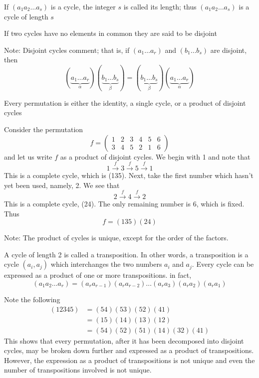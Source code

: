 \documentclass[12pt]{article}
\begin{document}
\begin{definition} If $(a_1a_2\dots a_s)$ is a cycle, the integer $s$ is called its length; thus $(a_1a_2\dots a_s)$ is a cycle of length $s$ \end{definition} 

\begin{definition} If two cycles have no elements in common they are said to be disjoint \end{definition} 

Note: Disjoint cycles comment; that is, if $(a_1\dots a_r)$ and $(b_1\dots b_s)$ are disjoint, then $$(\underbrace{a_1\dots a_r}_{\alpha})(\underbrace{b_1\dots b_s}_{\beta}) = (\underbrace{b_1\dots b_s}_{\beta})(\underbrace{a_1\dots a_r}_{\alpha}) $$ 

\begin{theorem} Every permutation is either the identity, a single cycle, or a product of disjoint cycles \end{theorem} 

\begin{example} Consider the permutation $$f = \begin{pmatrix} 1 & 2 & 3 & 4 & 5 & 6 \\ 3 & 4 & 5 & 2 & 1 & 6 \end{pmatrix} $$ and let us write $f$ as a product of disjoint cycles. We begin with 1 and note that $$ 1 \overset{f}{\rightarrow} 3 \overset{f}{\rightarrow} 5 \overset{f}{\rightarrow} 1 $$
This is a complete cycle, which is (135). Next, take the first number which hasn't yet been used, namely, 2. We see that $$2 \overset{f}{\rightarrow} 4 \overset{f}{\rightarrow} 2 $$ This is a complete cycle, (24). The only remaining number is 6, which is fixed. Thus $$ f = (135)(24)$$ \end{example}  

Note: The product of cycles is unique, except for the order of the factors. 

\begin{definition} A cycle of length 2 is called a transposition. In other words, a transposition is a cycle $(a_i, a_j)$ which interchanges the two numbers $a_i$ and $a_j$. Every cycle can be expressed as a product of one or more transpositions. in fact, $$ (a_1a_2 \dots a_r) = (a_ra_{r - 1})(a_ra_{r - 2}) \dots (a_ra_3)(a_ra_2)(a_ra_1)$$  \end{definition} 

\begin{example} Note the following $$ \begin{aligned} (12345) &= (54)(53)(52)(41) \\ &= (15)(14)(13)(12) \\ &= (54)(52)(51)(14)(32)(41) \end{aligned} $$ This shows that every permutation, after it has been decomposed into disjoint cycles, may be broken down further and expressed as a product of transpositions. However, the expression as a product of transpositions is not unique and even the number of transpositions involved is not unique. \end{example} 
\end{document}
